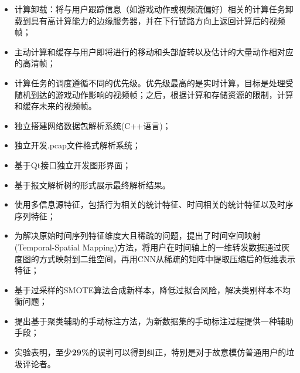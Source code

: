 \documentclass{resume}
\begin{document}
\begin{itemize}
  \item 计算卸载：将与用户跟踪信息（如游戏动作或视频流偏好）相关的计算任务卸载到具有高计算能力的边缘服务器，并在下行链路方向上返回计算后的视频帧；
  \item 主动计算和缓存与用户即将进行的移动和头部旋转以及估计的大量动作相对应的高清帧；
  \item 计算任务的调度遵循不同的优先级。优先级最高的是实时计算，目标是处理受随机到达的游戏动作影响的视频帧；之后，根据计算和存储资源的限制，计算和缓存未来的视频帧。
\end{itemize}

\begin{itemize}
  \item 独立搭建网络数据包解析系统(C++语言)；
  \item 独立开发.pcap文件格式解析系统；
  \item 基于Qt接口独立开发图形界面；
  \item 基于报文解析树的形式展示最终解析结果。
\end{itemize}

\begin{itemize}
  \item 使用多信息源特征，包括行为相关的统计特征、时间相关的统计特征以及时序序列特征；
  \item 为解决原始时间序列特征维度大且稀疏的问题，提出了时间空间映射(Temporal-Spatial Mapping)方法，将用户在时间轴上的一维转发数据通过灰度图的方式映射到二维空间，再用CNN从稀疏的矩阵中提取压缩后的低维表示特征；
  \item 基于过采样的SMOTE算法合成新样本，降低过拟合风险，解决类别样本不均衡问题；
  \item 提出基于聚类辅助的手动标注方法，为新数据集的手动标注过程提供一种辅助手段；
  \item 实验表明，至少\textbf{29\%}的误判可以得到纠正，特别是对于故意模仿普通用户的垃圾评论者。
\end{itemize}
\end{document}
